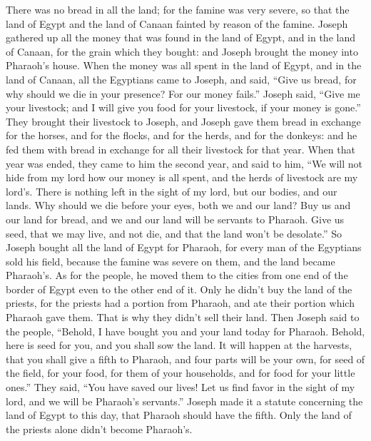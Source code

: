  There was no bread in all the land; for the famine was
very severe, so that the land of Egypt and the land of Canaan fainted by
reason of the famine.  Joseph gathered up all the money
that was found in the land of Egypt, and in the land of Canaan, for the
grain which they bought: and Joseph brought the money into Pharaoh's
house.  When the money was all spent in the land of
Egypt, and in the land of Canaan, all the Egyptians came to Joseph, and
said, ``Give us bread, for why should we die in your presence? For our
money fails.''  Joseph said, ``Give me your livestock;
and I will give you food for your livestock, if your money is gone.''
 They brought their livestock to Joseph, and Joseph gave
them bread in exchange for the horses, and for the flocks, and for the
herds, and for the donkeys: and he fed them with bread in exchange for
all their livestock for that year.  When that year was
ended, they came to him the second year, and said to him, ``We will not
hide from my lord how our money is all spent, and the herds of livestock
are my lord's. There is nothing left in the sight of my lord, but our
bodies, and our lands.  Why should we die before your
eyes, both we and our land? Buy us and our land for bread, and we and
our land will be servants to Pharaoh. Give us seed, that we may live,
and not die, and that the land won't be desolate.''  So
Joseph bought all the land of Egypt for Pharaoh, for every man of the
Egyptians sold his field, because the famine was severe on them, and the
land became Pharaoh's.  As for the people, he moved them
to the cities from one end of the border of Egypt even to the other end
of it.  Only he didn't buy the land of the priests, for
the priests had a portion from Pharaoh, and ate their portion which
Pharaoh gave them. That is why they didn't sell their land.
 Then Joseph said to the people, ``Behold, I have bought
you and your land today for Pharaoh. Behold, here is seed for you, and
you shall sow the land.  It will happen at the harvests,
that you shall give a fifth to Pharaoh, and four parts will be your own,
for seed of the field, for your food, for them of your households, and
for food for your little ones.''  They said, ``You have
saved our lives! Let us find favor in the sight of my lord, and we will
be Pharaoh's servants.''  Joseph made it a statute
concerning the land of Egypt to this day, that Pharaoh should have the
fifth. Only the land of the priests alone didn't become Pharaoh's.

